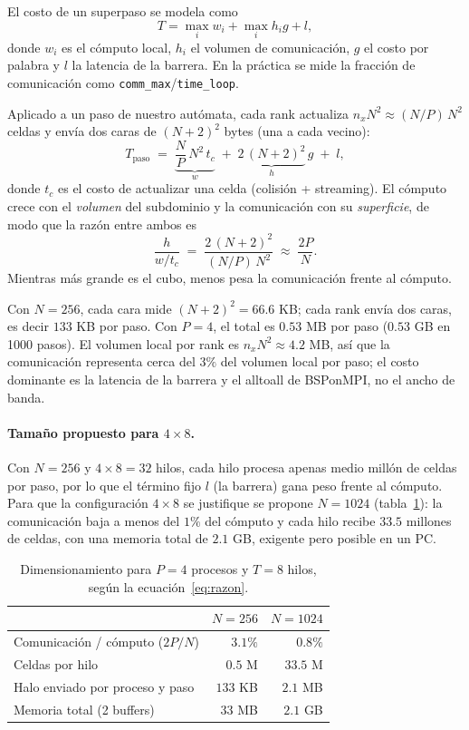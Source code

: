 \documentclass[11pt,a4paper]{article}
\begin{document}
El costo de un superpaso se modela como
\begin{equation}
  T = \max_i w_i + \max_i h_i g + l,
\end{equation}
donde $w_i$ es el cómputo local, $h_i$ el volumen de comunicación, $g$ el costo
por palabra y $l$ la latencia de la barrera. En la práctica se mide la
fracción de comunicación como \texttt{comm\_max}/\texttt{time\_loop}.

Aplicado a un paso de nuestro autómata, cada rank actualiza $n_x N^2\approx
(N/P)\,N^2$ celdas y envía dos caras de $(N+2)^2$ bytes (una a cada vecino):
\begin{equation}
  T_{\text{paso}} \;=\;
  \underbrace{\frac{N}{P}\,N^2\,t_c}_{w}
  \;+\;
  \underbrace{2\,(N+2)^2}_{h}\,g
  \;+\; l,
  \label{eq:costo-paso}
\end{equation}
donde $t_c$ es el costo de actualizar una celda (colisión + streaming). El
cómputo crece con el \emph{volumen} del subdominio y la comunicación con su
\emph{superficie}, de modo que la razón entre ambos es
\begin{equation}
  \frac{h}{w/t_c} \;=\; \frac{2\,(N+2)^2}{(N/P)\,N^2} \;\approx\; \frac{2P}{N}.
  \label{eq:razon}
\end{equation}
Mientras más grande es el cubo, menos pesa la comunicación frente al cómputo.

Con $N=256$, cada cara mide $(N+2)^2=66.6$ KB; cada rank envía dos caras, es
decir $133$ KB por paso. Con $P=4$, el total es $0.53$ MB por paso
($0.53$ GB en 1000 pasos). El volumen local por rank es
$n_xN^2\approx4.2$ MB, así que la comunicación representa cerca del $3\%$ del
volumen local por paso; el costo dominante es la latencia de la barrera y el
alltoall de BSPonMPI, no el ancho de banda.

\paragraph{Tamaño propuesto para $4\times8$.}
Con $N=256$ y $4\times8=32$ hilos, cada hilo procesa apenas medio millón de
celdas por paso, por lo que el término fijo $l$ (la barrera) gana peso frente
al cómputo. Para que la configuración $4\times8$ se justifique se propone
$N=1024$ (tabla~\ref{tab:sizing}): la comunicación baja a menos del $1\%$ del
cómputo y cada hilo recibe $33.5$ millones de celdas, con una memoria total de
$2.1$ GB, exigente pero posible en un PC.

\begin{table}[H]
\centering
\caption{Dimensionamiento para $P=4$ procesos y $T=8$ hilos, según
la ecuación~\eqref{eq:razon}.}
\label{tab:sizing}
\begin{tabular}{lrr}
\toprule
 & $N=256$ & $N=1024$ \\
\midrule
Comunicación / cómputo ($2P/N$) & $3.1\%$ & $0.8\%$ \\
Celdas por hilo & $0.5$ M & $33.5$ M \\
Halo enviado por proceso y paso & $133$ KB & $2.1$ MB \\
Memoria total (2 buffers) & $33$ MB & $2.1$ GB \\
\bottomrule
\end{tabular}
\end{table}
\end{document}
